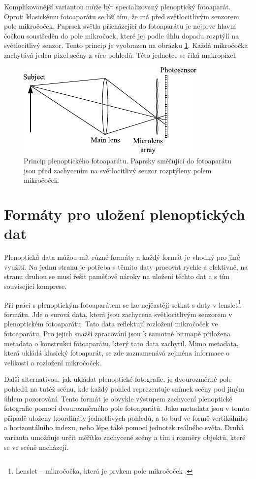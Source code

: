 Komplikovanější variantou může být specializovaný plenoptický fotoaparát.
Oproti klasickému fotoaparátu se liší tím, že má před světlocitlivým senzorem pole mikročoček.
Paprsek světla přicházející do fotoaparátu je nejprve hlavní čočkou soustředěn do pole mikročoek, které jej podle úhlu dopadu rozptýlí na světlocitlivý senzor.
Tento princip je vyobrazen na obrázku \ref{plenoPrincip}.
Každá mikročočka zachytává jeden pixel scény z více pohledů.
Této jednotce se říká makropixel.

\begin{figure}
	\centering
		\includegraphics[width=.4\textwidth]{obrazky-figures/pleno-cam.pdf}
		\caption{Princip plenoptického fotoaparátu. Paprsky směřující do fotoaparátu jsou před zachycením na světlocitlivý senzor rozptýleny polem mikročoček.}
		\label{plenoPrincip}
\end{figure}

\section{Formáty pro uložení plenoptických dat}
Plenoptická data můžou mít různé formáty a každý formát je vhodný pro jiné využití.
Na jednu stranu je potřeba s těmito daty pracovat rychle a efektivně, na stranu druhou se musí řešit paměťové nároky na uložení těchto dat a s tím související komprese.

Při práci s plenoptickým fotoaparátem se lze nejčastěji setkat s daty v lenslet\footnote{Lenslet -- mikročočka, která je prvkem pole mikročoček \cite{lenslet}.} formátu. Jde o surová data, která jsou zachycena světlocitlivým senzorem v plenoptickém fotoaparátu.
Tato data reflektují rozložení mikročoček ve fotoaparátu.
Pro jejich snažší zpracování jsou k samotné bitmapě přiložena metadata o konstrukci fotoaparátu, který tato data zachytil.
Mimo metadata, která ukládá klasický fotoaparát, se zde zaznamenává zejména informace o velikosti a rozložení mikročoček.

Další alternativou, jak ukládat plenoptické fotografie, je dvourozměrné pole pohledů na tutéž scénu, kde každý pohled reprezentuje snímek scény pod jiným úhlem pozorování.
Tento formát je obvykle výstupem zachycení plenoptické fotografie pomocí dvourozměrného pole fotoaparátů.
Jako metadata jsou v tomto případě uloženy koordináty jednotlivých pohledů, a to buď ve formě vertikálního a horizontálního indexu, nebo lépe také pomocí jednotek reálného světa.
Druhá varianta umožňuje určit měřítko zachycené scény a tím i rozměry objektů, které se ve scéně nacházejí.


